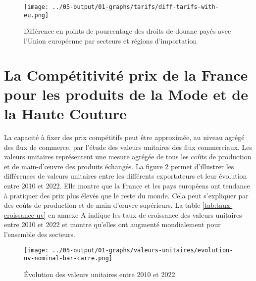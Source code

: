 \documentclass[french,10pt,a4paper]{article}
\begin{document}
\begin{tcolorbox}[title=Encadré 1 : Droits de douane]
\begin{figure}[H] %
    \centering
    \texttt{[image: ../05-output/01-graphs/tarifs/diff-tarifs-with-eu.png]}
    \captionsetup{justification=raggedright, singlelinecheck=false, font=small}
    \caption*{Source : MAcMap-HS6, calcul des auteurs}
    \captionsetup{justification=centering, singlelinecheck=true, font=normalsize}
    \caption{Différence en points de pourcentage des droits de douane payés avec l'Union européenne par secteurs et régions d'importation}
    \label{fig:diff-tarifs}
\end{figure}
  
\end{tcolorbox}



\newpage
{}
\section{La Compétitivité prix de la France pour les produits de la Mode et de la Haute Couture}
La capacité à fixer des prix compétitifs peut être approximée, au niveau agrégé des flux de commerce, par l'étude des valeurs unitaires des flux commerciaux. Les valeurs unitaires représentent une mesure agrégée de tous les coûts de production et de main-d'œuvre des produits échangés. La figure \ref{fig:valeurs-unitaires} permet d'illustrer les différences de valeurs unitaires entre les différents exportateurs et leur évolution entre 2010 et 2022. Elle montre que la France et les pays européens ont tendance à pratiquer des prix plus élevés que le reste du monde. Cela peut s'expliquer par des coûts de production et de main-d'œuvre supérieurs. La table \ref{tab:taux-croissance-uv} en annexe A indique les taux de croissance des valeurs unitaires entre 2010 et 2022 et montre qu'elles ont augmenté mondialement pour l'ensemble des secteurs.

\begin{figure}[!h]
  \centering
  \texttt{[image: ../05-output/01-graphs/valeurs-unitaires/evolution-uv-nominal-bar-carre.png]}
  \captionsetup{justification=justified, singlelinecheck=false, font=small}
  \caption*{Note : Les barres représentent les valeurs pour 2022, tandis que les carrés représentent les valeurs pour 2010. \\
  Note 2 : La Turquie a été retirée du graphique dans le secteur de la bijouterie pour des raisons de lisibilité. La valeur unitaire médiane de la Turquie en 2010 est de 80,4. En 2022, elle est de 5920,2. \\
  Source : BACI, calcul des auteurs}
  \captionsetup{justification=centering, singlelinecheck=true, font=normalsize}
  \caption{Évolution des valeurs unitaires entre 2010 et 2022}
  \label{fig:valeurs-unitaires}
\end{figure}
\end{document}
